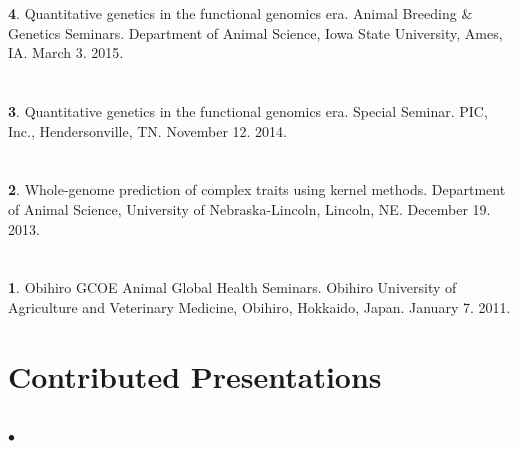 \documentclass[margin,line,10pt]{res}
\newenvironment{list1}{
  \begin{list}{\ding{113}}{%
      \setlength{\itemsep}{0in}
      \setlength{\parsep}{0in} \setlength{\parskip}{0in}
      \setlength{\topsep}{0in} \setlength{\partopsep}{0in} 
      \setlength{\leftmargin}{0.17in}}}{\end{list}}
\newenvironment{list2}{
  \begin{list}{$\bullet$}{%
      \setlength{\itemsep}{0in}
      \setlength{\parsep}{0in} \setlength{\parskip}{0in}
      \setlength{\topsep}{0in} \setlength{\partopsep}{0in} 
      \setlength{\leftmargin}{0.2in}}}{\end{list}}
\begin{document}
\begin{resume}
\begin{list1}
  \vspace{0.5cm}

\item [{\bf 4}.] Quantitative genetics in the functional genomics era. Animal Breeding \& Genetics Seminars. Department of Animal Science, Iowa State University, Ames, IA. March 3. 2015.
\end{list1}

\section{}
\begin{list1}
\item [{\bf 3}.] Quantitative genetics in the functional genomics era. Special Seminar. PIC, Inc., Hendersonville, TN.  November 12. 2014.
\end{list1}

\section{}
\begin{list1}
\item [{\bf 2}.] Whole-genome prediction of complex traits using kernel methods. Department of Animal Science, University of Nebraska-Lincoln, Lincoln, NE. December 19. 2013.
\end{list1}

\section{}
\begin{list1}
\item [{\bf 1}.] Obihiro GCOE Animal Global Health Seminars.  Obihiro University of Agriculture and  Veterinary Medicine, Obihiro, Hokkaido, Japan. January 7. 2011.
\end{list1}  



\vspace{0.5cm}
\section{\sc Contributed Presentations}
\vspace{1.0cm}

\section{}
\begin{list2}


\end{list2}
\end{resume}
\end{document}
